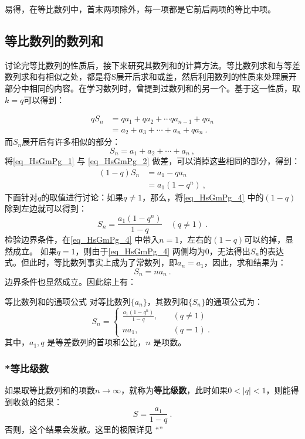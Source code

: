 易得，在等比数列中，首末两项除外，每一项都是它前后两项的等比中项。

\subsection{等比数列的数列和}


讨论完等比数列的性质后，接下来研究其数列和的计算方法。等比数列求和与等差数列求和有相似之处，都是将S展开后求和或差，然后利用数列的性质来处理展开部分中相同的内容。在学习数列时，曾提到过数列和的另一个。基于这一性质，取$k=q$可以得到：

\begin{equation}\label{eq_HsGmPg_1}
\begin{aligned}
qS_n &= qa_1 + qa_2 + \cdots qa_{n-1}+ qa_n\\
&=a_2 + a_3 + \cdots + a_n+qa_n~.
\end{aligned}
\end{equation}
而$S_n$展开后有许多相似的部分：
\begin{equation}\label{eq_HsGmPg_2}
S_n = a_1 + a_2 + \cdots + a_n~,
\end{equation}
将\autoref{eq_HsGmPg_1} 与 \autoref{eq_HsGmPg_2} 做差，可以消掉这些相同的部分，得到：
\begin{equation}\label{eq_HsGmPg_4}
\begin{aligned}
(1 - q)S_n &= a_1 - qa_n\\
&= a_1(1 - q^n)~,
\end{aligned}
\end{equation}
下面针对$q$的取值进行讨论：如果$q\neq1$，那么，将\autoref{eq_HsGmPg_4} 中的$(1-q)$除到左边就可以得到：
\begin{equation}
S_n = \frac{a_1(1-q^n)}{1-q} \quad (q\neq 1)~.
\end{equation}
检验边界条件，在\autoref{eq_HsGmPg_4} 中带入$n=1$，左右的$(1-q)$可以约掉，显然成立。
如果$q=1$，则由于\autoref{eq_HsGmPg_4} 两侧均为0，无法得出$S_n$的表达式。但此时，等比数列事实上成为了常数列，即$a_n=a_1$，因此，求和结果为：
\begin{equation}
S_n=na_n~.
\end{equation}
边界条件也显然成立。因此综上有：

\begin{corollary}{等比数列和的通项公式}
对等比数列$\{a_n\}$，其数列和$\{S_n\}$的通项公式为：
\begin{equation}
S_n = \begin{cases}
\displaystyle\frac{a_1(1-q^n)}{1-q} ,\quad &(q \neq 1)\\
na_1, \quad &(q = 1)~.
\end{cases}
\end{equation}
其中，$a_1,q$ 是等差数列的首项和公比，$n$ 是项数。
\end{corollary}



\subsubsection{*等比级数}

如果取等比数列和的项数$n\rightarrow \infty$，就称为\textbf{等比级数}，此时如果$0<|q|<1$，则能得到收敛的结果：
\begin{equation}
S = \frac{a_1}{1 - q}~.
\end{equation}
否则，这个结果会发散。这里的极限详见 “”
